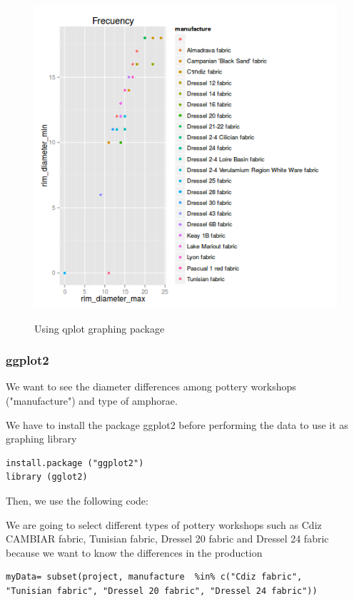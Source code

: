 \documentclass[10pt,a4paper]{article}
\begin{document}
\begin{figure}[hdp]
\centering
\includegraphics[scale=0.45]{qplotminmax.png}
\label{qplot}
\caption{Using qplot graphing package}
\end{figure}


\subsubsection{ggplot2}

We want to see the diameter differences among pottery workshops ("manufacture") and type of amphorae. 

We have to install the package ggplot2 before performing the data to use it as graphing library 

\begin{verbatim}
install.package ("ggplot2")
library (gglot2)
\end{verbatim}


Then, we use the following code: 

We are going to select different types of pottery workshops such as Cdiz CAMBIAR fabric, Tunisian fabric, Dressel 20 fabric and Dressel 24 fabric because we want to know the differences in the production

\begin{verbatim}
myData= subset(project, manufacture  %in% c("Cdiz fabric", 
"Tunisian fabric", "Dressel 20 fabric", "Dressel 24 fabric"))

\end{verbatim}
\end{document}
